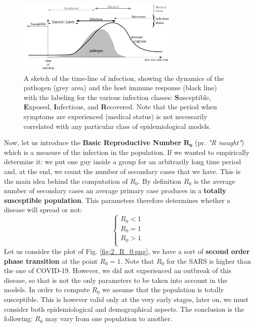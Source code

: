 \documentclass[../main/main.tex]{subfiles}
\begin{document}
\begin{figure}[h!]
\centering
\includegraphics[width=0.7\textwidth]{../lessons/image/02/5.png}
\caption{\label{fig:2_5} A sketch of the time-line of infection, showing the dynamics of the pathogen (grey area) and the host immune response (black line) with the labeling for the various infection classes: \textbf{S}usceptible, \textbf{E}xposed, \textbf{I}nfectious, and \textbf{R}ecovered. Note that the period when symptoms are experienced (medical status) is not necessarily correlated with any particular class of epidemiological models.}
\end{figure}

Now, let us introduce the \textbf{Basic Reproductive Number} $\mathbf{R_0}$ (pr. \textit{"R naught"}) which is a measure of the infection in the population. If we wanted to empirically determine it: we put one guy inside a group for an arbitrarily long time period and, at the end, we count the number of secondary cases that we have. This is the main idea behind the computation of \( R_0 \). By definition \( R_0 \) is the average number of secondary cases an average primary case produces in a \textbf{totally susceptible population}. 
This parameters therefore determines whether a disease will spread or not:
  \begin{equation}
    \begin{cases}
     R_0 < 1\\
     R_0 = 1\\
     R_0 > 1\\
    \end{cases}
  \end{equation}
Let us consider the plot of Fig. \ref{fig:2_R_0.png}, we have a sort of \textbf{second order phase transition} at the point $R_0=1$.
Note that $R_0$ for the SARS is higher than the one of COVID-19. However, we did not experienced an outbreak of this disease, so that is not the only parameters to be taken into account in the models. In order to compute $R_0$ we assume that the population is totally susceptible. This is however valid only at the very early stages, later on, we must consider both epidemiological and demographical aspects. The conclusion is the following: $R_0$ may vary from one population to another.
\end{document}
